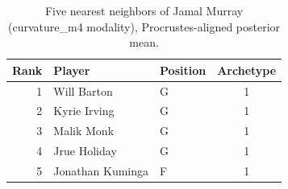 \begin{table}[htbp]
  \centering\small
  \begin{tabular}{rllc}
    \toprule
    Rank & Player & Position & Archetype \\
    \midrule
    1 & Will Barton & G & 1 \\
    2 & Kyrie Irving & G & 1 \\
    3 & Malik Monk & G & 1 \\
    4 & Jrue Holiday & G & 1 \\
    5 & Jonathan Kuminga & F & 1 \\
    \bottomrule
  \end{tabular}
  \caption{Five nearest neighbors of Jamal Murray (curvature_m4 modality), Procrustes-aligned posterior mean.}
  \label{tab:Jamal_Murray_neighbors_curvature_m4}
\end{table}

